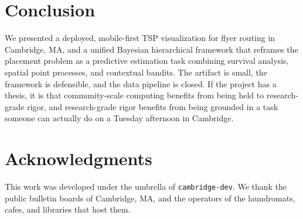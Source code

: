 \documentclass[sigconf,nonacm]{acmart}
\begin{document}
\section{Conclusion}

We presented a deployed, mobile-first TSP visualization for flyer routing in Cambridge, MA, and a unified Bayesian hierarchical framework that reframes the placement problem as a predictive estimation task combining survival analysis, spatial point processes, and contextual bandits. The artifact is small, the framework is defensible, and the data pipeline is closed. If the project has a thesis, it is that community-scale computing benefits from being held to research-grade rigor, and research-grade rigor benefits from being grounded in a task someone can actually do on a Tuesday afternoon in Cambridge.

\section*{Acknowledgments}

This work was developed under the umbrella of \texttt{cambridge-dev}. We thank the public bulletin boards of Cambridge, MA, and the operators of the laundromats, cafes, and libraries that host them.
\end{document}
